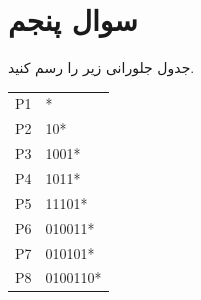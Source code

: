 \section{سوال پنجم}

 جدول جلورانی زیر را رسم کنید.

\begin{latin}
		\begin{tabular}{l l}
			P1 & * \\
			P2 & 10* \\
			P3 & 1001* \\
			P4 & 1011* \\
			P5 & 11101* \\
			P6 & 010011* \\
			P7 & 010101* \\
			P8 & 0100110* \\
		\end{tabular}
\end{latin}


